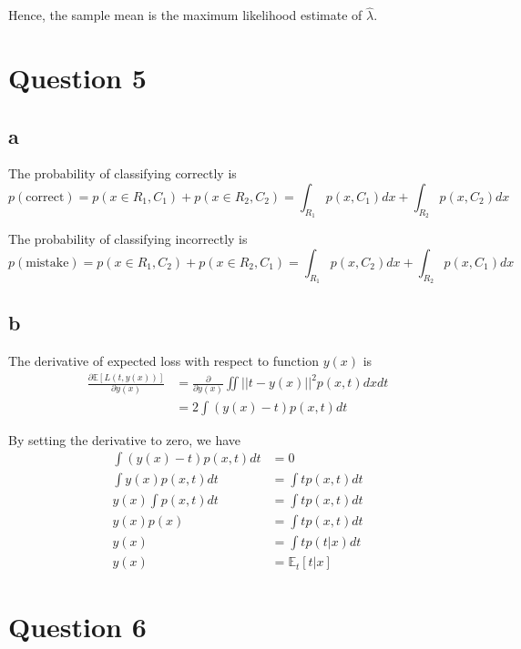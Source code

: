 \documentclass[a4paper,12pt]{article}
\newcommand{\pard}[2]{\frac{\partial #1}{\partial #2}}
\begin{document}
Hence, the sample mean is the maximum likelihood estimate of $\hat{\lambda}$.

\section*{Question 5}

\subsection*{a}

The probability of classifying correctly is
\begin{equation*}
	p(\text{correct}) = p(x \in R_1, C_1) + p(x \in R_2, C_2) = \int_{R_1} p(x, C_1) dx + \int_{R_2} p(x, C_2) dx
\end{equation*}

The probability of classifying incorrectly is
\begin{equation*}
	p(\text{mistake}) = p(x \in R_1, C_2) + p(x \in R_2, C_1) = \int_{R_1} p(x, C_2) dx + \int_{R_2} p(x, C_1) dx
\end{equation*}

\subsection*{b}

The derivative of expected loss with respect to function $y(x)$ is
\begin{align*}
	\pard{\mathbb{E}[L(t, y(x))]}{y(x)} &= \pard{}{y(x)} \iint ||t - y(x)||^2 p(x, t) dx dt \\
	&= 2 \int (y(x) - t) p(x, t) dt
\end{align*}

By setting the derivative to zero, we have
\begin{align*}
	\int (y(x) - t) p(x, t) dt &= 0 \\
	\int y(x) p(x, t) dt &= \int t p(x, t) dt \\
	y(x) \int p(x, t) dt &= \int t p(x, t) dt \\
	y(x) p(x) &= \int t p(x, t) dt \\
	y(x) &= \int t p(t | x) dt \\
	y(x) &= \mathbb{E}_t[t | x]
\end{align*}

\section*{Question 6}
\end{document}
